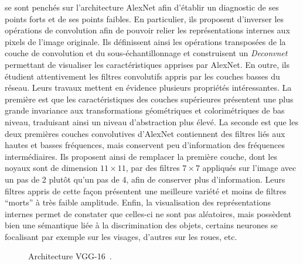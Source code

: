 \citet{zeiler_visualizing_2014} se sont penchés sur l'architecture AlexNet afin d'établir un diagnostic de ses points forts et de ses points faibles. En particulier, ils proposent d'inverser les opérations de convolution afin de pouvoir relier les représentations internes aux pixels de l'image originale. Ils définissent ainsi les opérations transposées de la couche de convolution et du sous-échantillonnage et construisent un \emph{Deconvnet} permettant de visualiser les caractéristiques apprises par AlexNet. En outre, ils étudient attentivement les filtres convolutifs appris par les couches basses du réseau. Leurs travaux mettent en évidence plusieurs propriétés intéressantes. La première est que les caractéristiques des couches supérieures présentent une plus grande invariance aux transformations géométriques et colorimétriques de bas niveau, traduisant ainsi un niveau d'abstraction plus élevé. La seconde est que les deux premières couches convolutives d'AlexNet contiennent des filtres liés aux hautes et basses fréquences, mais conservent peu d'information des fréquences intermédiaires. Ils proposent ainsi de remplacer la première couche, dont les noyaux sont de dimension $11\times11$, par des filtres $7\times7$ appliqués sur l'image avec un pas de 2 plutôt qu'un pas de 4, afin de conserver plus d'information. Leurs filtres appris de cette façon présentent une meilleure variété et moins de filtres ``morts'' à très faible amplitude. Enfin, la visualisation des représentations internes permet de constater que celles-ci ne sont pas aléatoires, mais possèdent bien une sémantique liée à la discrimination des objets, certains neurones se focalisant par exemple sur les visages, d'autres sur les roues, etc.

\begin{figure}[t]
  \resizebox{\textwidth}{!}{
    
  }
  \caption[Architecture VGG-16.]{Architecture VGG-16~\cite{simonyan_very_2014}.}
  \label{fig:vgg}
\end{figure}

